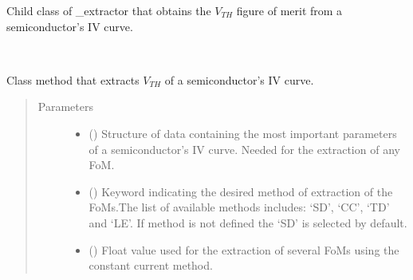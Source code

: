\documentclass[letterpaper,10pt,english,openany, oneside]{sphinxmanual}
\begin{document}

\begin{fulllineitems}
\label{\detokenize{index:fompy.fom.vth_ext}}
Child class of \_extractor that obtains the \(V_{TH}\) figure of merit from a semiconductor’s IV curve.

\begin{fulllineitems}
\label{\detokenize{index:fompy.fom.vth_ext.extraction}}~

\begin{fulllineitems}
Class method that extracts \(V_{TH}\) of a semiconductor’s IV curve.

\end{fulllineitems}

\begin{quote}\begin{description}
\item[{Parameters}] \leavevmode\begin{itemize}
\item {} 
 () \textendash{} Structure of data containing the most important parameters of a semiconductor’s IV curve.
Needed for the extraction of any FoM.

\item {} 
 () \textendash{} Keyword indicating the desired method of extraction of the FoMs.The list of available methods includes:
‘SD’, ‘CC’, ‘TD’ and ‘LE’. If method is not defined the ‘SD’ is selected by default.

\item {} 
 (\sphinxstyleliteralemphasis{\sphinxupquote{, }}) \textendash{} Float value used for the extraction of several FoMs using the constant current method.


\end{itemize}
\end{description}
\end{quote}
\end{fulllineitems}
\end{fulllineitems}
\end{document}

